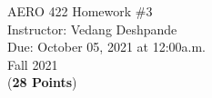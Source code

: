 \documentclass[]{article}
\begin{document}

\begin{center}
    {\Large AERO 422 Homework \#3}\\ %
    \vspace{0.2 cm}
    Instructor: Vedang Deshpande\\ %
    \vspace{0.2 cm}
    Due: October 05, 2021 at 12:00a.m.\\ %
    \vspace{0.2 cm}
    Fall 2021\\ %
    \vspace{0.2 cm}
    (\textbf{28 Points})\\
\end{center}

\vspace{0.2 cm}
\end{document}

